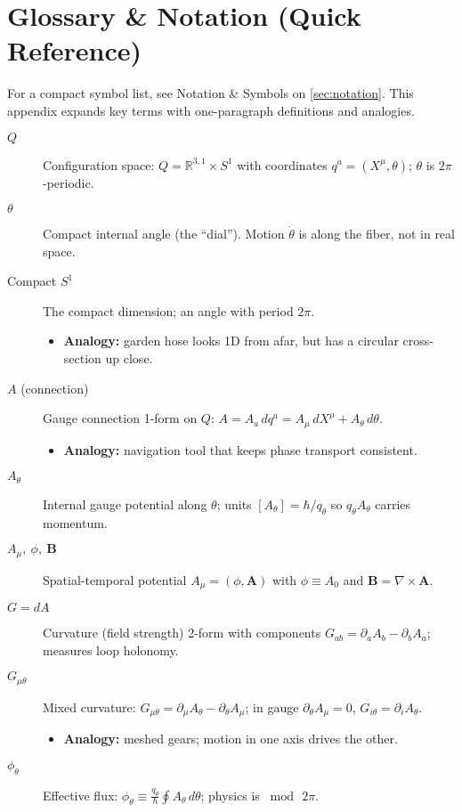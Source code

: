 \section*{Glossary \& Notation (Quick Reference)}
For a compact symbol list, see Notation \& Symbols on \cref{sec:notation}. This appendix expands key terms with one-paragraph definitions and analogies.
\begin{description}
  \item[$Q$] Configuration space: $Q=\mathbb{R}^{3,1}\times S^1$ with coordinates $q^a=(X^\mu,\theta)$; $\theta$ is $2\pi$-periodic.
  \item[$\theta$] Compact internal angle (the ``dial''). Motion $\dot\theta$ is along the fiber, not in real space.
  \item[Compact $S^1$] The compact dimension; an angle with period $2\pi$.
    \begin{itemize}
      \item \textbf{Analogy:} garden hose looks 1D from afar, but has a circular cross-section up close.
    \end{itemize}
  \item[$A$ (connection)] Gauge connection 1-form on $Q$: $A=A_a\,dq^a= A_\mu\,dX^\mu + A_\theta\,d\theta$.
    \begin{itemize}
      \item \textbf{Analogy:} navigation tool that keeps phase transport consistent.
    \end{itemize}
  \item[$A_\theta$] Internal gauge potential along $\theta$; units $[A_\theta]=\hbar/q_\theta$ so $q_\theta A_\theta$ carries momentum.
  \item[$A_\mu,\ \phi,\ \mathbf B$] Spatial-temporal potential $A_\mu=(\phi,\mathbf A)$ with $\phi\equiv A_0$ and $\mathbf B=\nabla\times \mathbf A$.
  \item[$G=dA$] Curvature (field strength) 2-form with components $G_{ab}=\partial_aA_b-\partial_bA_a$; measures loop holonomy.
  \item[$G_{\mu\theta}$] Mixed curvature: $G_{\mu\theta}=\partial_\mu A_\theta-\partial_\theta A_\mu$; in gauge $\partial_\theta A_\mu=0$, $G_{i\theta}=\partial_i A_\theta$.
    \begin{itemize}
      \item \textbf{Analogy:} meshed gears; motion in one axis drives the other.
    \end{itemize}
  \item[$\phi_\theta$] Effective flux: $\phi_\theta \equiv \tfrac{q_\theta}{\hbar}\oint A_\theta\,d\theta$; physics is $\bmod\,2\pi$.

\end{description}
